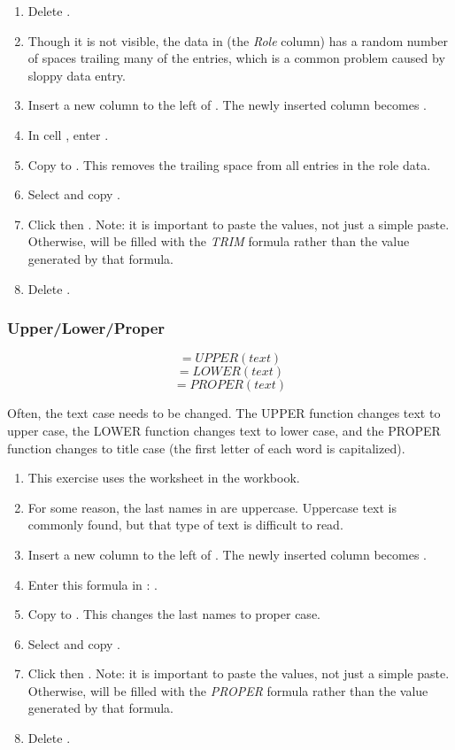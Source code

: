 \begin{enumerate}
	\item Delete .
	\item Though it is not visible, the data in  (the \textit{Role} column) has a random number of spaces trailing many of the entries, which is a common problem caused by sloppy data entry.
	\item Insert a new column to the left of . The newly inserted column becomes .
	\item In cell , enter .
	\item Copy  to . This removes the trailing space from all entries in the role data.
	\item Select and copy .
	\item Click  then . Note: it is important to paste the values, not just a simple paste. Otherwise,  will be filled with the \textit{TRIM} formula rather than the value generated by that formula.
	\item Delete .
\end{enumerate}

\subsubsection{Upper/Lower/Proper}

\[ =UPPER(text) \]
\[ =LOWER(text) \]
\[ =PROPER(text) \]

Often, the text case needs to be changed. The UPPER function changes text to upper case, the LOWER function changes text to lower case, and the PROPER function changes to title case (the first letter of each word is capitalized). 

\begin{enumerate}
	\item This exercise uses the  worksheet in the  workbook.
	\item For some reason, the last names in  are uppercase. Uppercase text is commonly found, but that type of text is difficult to read.
	\item Insert a new column to the left of . The newly inserted column becomes .
	\item Enter this formula in : .
	\item Copy  to . This changes the last names to proper case.
	\item Select and copy .
	\item Click  then . Note: it is important to paste the values, not just a simple paste. Otherwise,  will be filled with the \textit{PROPER} formula rather than the value generated by that formula.
	\item Delete .
\end{enumerate}

